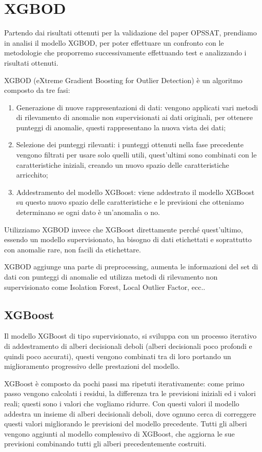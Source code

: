 \section{XGBOD}
Partendo dai risultati ottenuti per la validazione del paper OPS\textunderscore SAT, prendiamo in analisi il modello XGBOD, per poter effettuare un confronto con le metodologie che proporremo successivamente effettuando test e analizzando i risultati ottenuti.

XGBOD (eXtreme Gradient Boosting for Outlier Detection) è un algoritmo composto da tre fasi:
\begin{enumerate}
    \item Generazione di nuove rappresentazioni di dati: vengono applicati vari metodi di rilevamento di anomalie non supervisionati ai dati originali, per ottenere punteggi di anomalie, questi rappresentano la nuova vista dei dati;
    \item Selezione dei punteggi rilevanti: i punteggi ottenuti nella fase precedente vengono filtrati per usare solo quelli utili, quest'ultimi sono combinati con le caratteristiche iniziali, creando un nuovo spazio delle caratteristiche arricchito;
    \item Addestramento del modello XGBoost: viene addestrato il modello XGBoost su questo nuovo spazio delle caratteristiche e le previsioni che otteniamo determinano se ogni dato è un'anomalia o no.
\end{enumerate}
Utilizziamo XGBOD invece che XGBoost direttamente perché quest'ultimo, essendo un modello supervisionato, ha bisogno di dati etichettati e soprattutto con anomalie rare, non facili da etichettare.

XGBOD aggiunge una parte di preprocessing, aumenta le informazioni del set di dati con punteggi di anomalie ed utilizza metodi di rilevamento non supervisionato come Isolation Forest, Local Outlier Factor, ecc..

\subsection{XGBoost}
Il modello XGBoost di tipo supervisionato, si sviluppa con un processo iterativo di addestramento di alberi decisionali deboli (alberi decisionali poco profondi e quindi poco accurati), questi vengono combinati tra di loro portando un miglioramento progressivo delle prestazioni del modello.

XGBoost è composto da pochi passi ma ripetuti iterativamente: come primo passo vengono calcolati i residui, la differenza tra le previsioni iniziali ed i valori reali; questi sono i valori che vogliamo ridurre. Con questi valori il modello addestra un insieme di alberi decisionali deboli, dove ognuno cerca di correggere questi valori migliorando le previsioni del modello precedente. Tutti gli alberi vengono aggiunti al modello complessivo di XGBoost, che aggiorna le sue previsioni combinando tutti gli alberi precedentemente costruiti.

